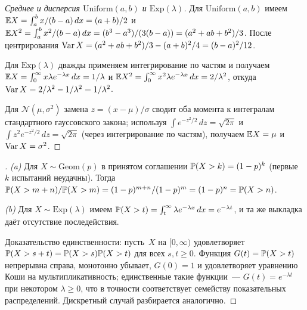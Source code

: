 \begin{proof}[Среднее и дисперсия $\mathrm{Uniform}(a, b)$ и $\mathrm{Exp}(\lambda)$]
Для $\mathrm{Uniform}(a, b)$ имеем $\mathbb{E} X = \int_a^b x/(b - a)\, dx = (a + b)/2$ и $\mathbb{E} X^2 = \int_a^b x^2/(b - a)\, dx = (b^3 - a^3)/(3(b - a)) = (a^2 + ab + b^2)/3$. После центрирования $\operatorname{Var} X = (a^2 + ab + b^2)/3 - (a + b)^2/4 = (b - a)^2/12$.

Для $\mathrm{Exp}(\lambda)$ дважды применяем интегрирование по частям и получаем $\mathbb{E} X = \int_0^{\infty} x \lambda e^{-\lambda x}\, dx = 1/\lambda$ и $\mathbb{E} X^2 = \int_0^{\infty} x^2 \lambda e^{-\lambda x}\, dx = 2/\lambda^2$, откуда $\operatorname{Var} X = 2/\lambda^2 - 1/\lambda^2 = 1/\lambda^2$.

Для $\mathcal{N}(\mu, \sigma^2)$ замена $z = (x - \mu)/\sigma$ сводит оба момента к интегралам стандартного гауссовского закона; используя $\int e^{-z^2/2}\, dz = \sqrt{2\pi}$ и $\int z^2 e^{-z^2/2}\, dz = \sqrt{2\pi}$ (через интегрирование по частям), получаем $\mathbb{E} X = \mu$ и $\operatorname{Var} X = \sigma^2$.
\end{proof}

\begin{proof}[]
\emph{(a)} Для $X \sim \mathrm{Geom}(p)$ в принятом соглашении $\mathbb{P}(X > k) = (1 - p)^k$ (первые~$k$ испытаний неудачны). Тогда $\mathbb{P}(X > m + n)/\mathbb{P}(X > m) = (1 - p)^{m + n}/(1 - p)^m = (1 - p)^n = \mathbb{P}(X > n)$.

\emph{(b)} Для $X \sim \mathrm{Exp}(\lambda)$ имеем $\mathbb{P}(X > t) = \int_t^{\infty} \lambda e^{-\lambda x}\, dx = e^{-\lambda t}$, и та же выкладка даёт отсутствие последействия.

Доказательство единственности: пусть~$X$ на $[0, \infty)$ удовлетворяет $\mathbb{P}(X > s + t) = \mathbb{P}(X > s) \mathbb{P}(X > t)$ для всех $s, t \geq 0$. Функция $G(t) = \mathbb{P}(X > t)$ непрерывна справа, монотонно убывает, $G(0) = 1$ и удовлетворяет уравнению Коши на мультипликативность; единственные такие функции~--- $G(t) = e^{-\lambda t}$ при некотором $\lambda \geq 0$, что в точности соответствует семейству показательных распределений. Дискретный случай разбирается аналогично.
\end{proof}

